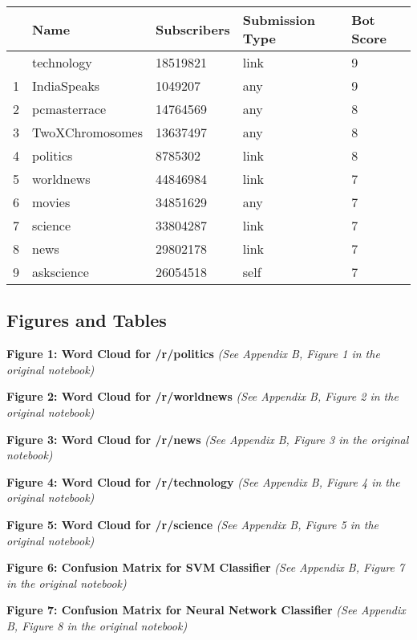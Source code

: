 \documentclass[
  12pt,
  letterpaper,
  DIV=11,
  numbers=noendperiod]{scrartcl}
\begin{document}
\begin{longtable}[]{@{}lllll@{}}
\toprule\noalign{}
& Name & Subscribers & Submission Type & Bot Score \\
\midrule\noalign{}
\endhead
\bottomrule\noalign{}
\endlastfoot
0 & technology & 18519821 & link & 9 \\
1 & IndiaSpeaks & 1049207 & any & 9 \\
2 & pcmasterrace & 14764569 & any & 8 \\
3 & TwoXChromosomes & 13637497 & any & 8 \\
4 & politics & 8785302 & link & 8 \\
5 & worldnews & 44846984 & link & 7 \\
6 & movies & 34851629 & any & 7 \\
7 & science & 33804287 & link & 7 \\
8 & news & 29802178 & link & 7 \\
9 & askscience & 26054518 & self & 7 \\
\end{longtable}

\subsection{Figures and Tables}\label{figures-and-tables}

\textbf{Figure 1: Word Cloud for /r/politics} \emph{(See Appendix B,
Figure 1 in the original notebook)}

\textbf{Figure 2: Word Cloud for /r/worldnews} \emph{(See Appendix B,
Figure 2 in the original notebook)}

\textbf{Figure 3: Word Cloud for /r/news} \emph{(See Appendix B, Figure
3 in the original notebook)}

\textbf{Figure 4: Word Cloud for /r/technology} \emph{(See Appendix B,
Figure 4 in the original notebook)}

\textbf{Figure 5: Word Cloud for /r/science} \emph{(See Appendix B,
Figure 5 in the original notebook)}

\textbf{Figure 6: Confusion Matrix for SVM Classifier} \emph{(See
Appendix B, Figure 7 in the original notebook)}

\textbf{Figure 7: Confusion Matrix for Neural Network Classifier}
\emph{(See Appendix B, Figure 8 in the original notebook)}
\end{document}
